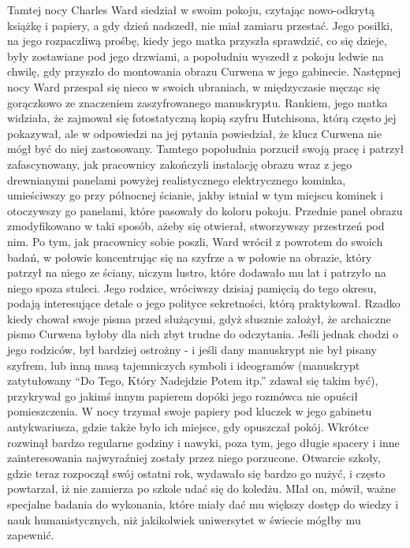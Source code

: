 Tamtej nocy Charles Ward siedział w swoim pokoju, czytając nowo-odkrytą książkę i papiery, a gdy dzień nadszedł, nie miał zamiaru przestać. Jego posiłki, na jego rozpaczliwą prośbę, kiedy jego matka przyszła sprawdzić, co się dzieje, były zostawiane pod jego drzwiami, a popołudniu wyszedł z pokoju ledwie na chwilę, gdy przyszło do montowania obrazu Curwena w jego gabinecie. Następnej nocy Ward przespał się nieco w swoich ubraniach, w międzyczasie męcząc się gorączkowo ze znaczeniem zaszyfrowanego manuskryptu. Rankiem, jego matka widziała, że zajmował się fotostatyczną kopią szyfru  Hutchisona, którą często jej pokazywał, ale w odpowiedzi na jej pytania powiedział, że klucz Curwena nie mógł być do niej zastosowany. Tamtego popołudnia porzucił swoją pracę i patrzył zafascynowany, jak pracownicy zakończyli instalację obrazu wraz z jego drewnianymi panelami powyżej realistycznego elektrycznego kominka, umieściwszy go przy północnej ścianie, jakby istniał w tym miejscu kominek i otoczywszy go panelami, które pasowały do koloru pokoju. Przednie panel obrazu zmodyfikowano w taki sposób, ażeby się otwierał, stworzywszy przestrzeń pod nim. Po tym, jak pracownicy sobie poszli, Ward wrócił z powrotem do swoich badań, w połowie koncentrując się na szyfrze a w połowie na obrazie, który patrzył na niego ze ściany, niczym lustro, które dodawało mu lat i patrzyło na niego spoza stuleci. Jego rodzice, wróciwszy dzisiaj pamięcią do tego okresu, podają interesujące detale o jego polityce sekretności, którą praktykował. Rzadko kiedy chował swoje pisma przed służącymi, gdyż słusznie założył, że archaiczne pismo Curwena byłoby dla nich zbyt trudne do odczytania. Jeśli jednak chodzi o jego rodziców, był bardziej ostrożny - i jeśli dany manuskrypt nie był pisany szyfrem, lub inną masą tajemniczych symboli i ideogramów (manuskrypt zatytułowany ``Do Tego, Który Nadejdzie Potem itp.'' zdawał się takim być), przykrywał go jakimś innym papierem dopóki jego rozmówca nie opuścił pomieszczenia. W nocy trzymał swoje papiery pod kluczek w jego gabinetu antykwariusza, gdzie także było ich miejsce, gdy opuszczał pokój. Wkrótce rozwinął bardzo regularne godziny i nawyki, poza tym, jego długie spacery i inne zainteresowania najwyraźniej zostały przez niego porzucone. Otwarcie szkoły, gdzie teraz rozpoczął swój ostatni rok, wydawało się bardzo go nużyć, i często powtarzał, iż nie zamierza po szkole udać się do koledżu. MIał on, mówił, ważne specjalne badania do wykonania, które miały dać mu większy dostęp do wiedzy i nauk humanistycznych, niż jakikolwiek uniwersytet w świecie mógłby mu zapewnić. 

